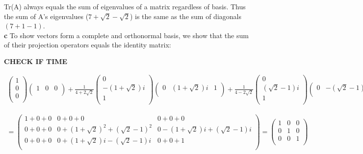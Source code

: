 \documentclass[10pt]{article} %
\begin{document}
Tr(A) always equals the sum of eigenvalues of a matrix regardless of basis. Thus the sum of A's eigenvalues ($7 + \sqrt{2} - \sqrt{2}$)
is the same as the sum of diagonals $(7 + 1 - 1)$.\\

\textbf{c}
To show vectors form a complete and orthonormal basis, we show that the sum of their projection operators equals the identity matrix:

\textbf{CHECK IF TIME}

\begin{align*}
  \begin{pmatrix}
    1\\
    0\\
    0\\
  \end{pmatrix}
  \begin{pmatrix}
    1 & 0 & 0\\
  \end{pmatrix} +
  \frac{1}{4+2\sqrt{2}}
  \begin{pmatrix}
    0\\
    -\left(1+\sqrt{2}\right)i\\
    1\\
  \end{pmatrix}
  \begin{pmatrix}
    0 & \left(1+\sqrt{2}\right)i & 1\\
  \end{pmatrix} +
  \frac{1}{4-2\sqrt{2}}
  \begin{pmatrix}
    0\\ \left(\sqrt{2}-1\right)i \\ 1\\
  \end{pmatrix}
  \begin{pmatrix}
    0 & -\left(\sqrt{2}-1\right)i & 1\\
  \end{pmatrix}
\end{align*}

\begin{align*}
  =
  \begin{pmatrix}
    1 + 0 + 0 & 0 + 0 + 0 & 0 + 0 + 0\\
    0 + 0 + 0 & 0 + \left(1+\sqrt{2}\right)^2 + \left(\sqrt{2}-1\right)^2& 0 -\left(1+\sqrt{2}\right)i + \left(\sqrt{2}-1\right)i \\
    0 + 0 + 0 & 0 + \left(1+\sqrt{2}\right)i - \left(\sqrt{2}-1\right)i & 0 + 0 + 1\\
  \end{pmatrix}
  =
  \begin{pmatrix}
    1 & 0 & 0\\
    0 & 1 & 0\\
    0 & 0 & 1\\
  \end{pmatrix}
\end{align*}
\end{document}
